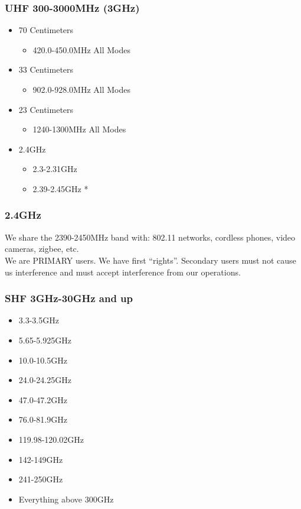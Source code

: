 \documentclass[10pt]{beamer}
\begin{document}
\begin{frame}
\frametitle{UHF 300-3000MHz (3GHz)}
\begin{itemize}
\item 70 Centimeters
\begin{itemize}
\item 420.0-450.0MHz All Modes
\end{itemize}
\item 33 Centimeters
\begin{itemize}
\item 902.0-928.0MHz All Modes
\end{itemize}
\item 23 Centimeters
\begin{itemize}
\item 1240-1300MHz All Modes
\end{itemize}
\item 2.4GHz
\begin{itemize}
\item 2.3-2.31GHz
\item 2.39-2.45GHz *
\end{itemize}
\end{itemize}
\end{frame}

\begin{frame}
\frametitle{2.4GHz}
We share the 2390-2450MHz band with: 802.11 networks, cordless phones, video cameras, zigbee, etc.\ \\
We are PRIMARY users. We have first ``rights''. Secondary users must not cause us interference and must accept interference from our operations.
\end{frame}

\begin{frame}
\frametitle{SHF 3GHz-30GHz and up}
\begin{itemize}
\item 3.3-3.5GHz
\item  5.65-5.925GHz
\item  10.0-10.5GHz
\item  24.0-24.25GHz
\item  47.0-47.2GHz
\item  76.0-81.9GHz
\item  119.98-120.02GHz
\item  142-149GHz
\item  241-250GHz
\item  Everything above 300GHz
\end{itemize}
\end{frame}
\end{document}
